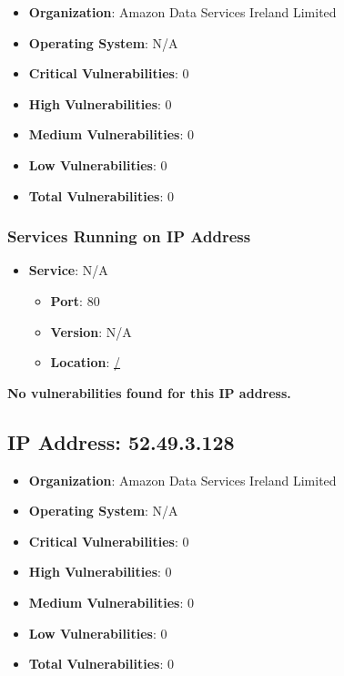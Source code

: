 \documentclass{article}
\begin{document}
\begin{itemize}
    \item \textbf{Organization}: Amazon Data Services Ireland Limited
    \item \textbf{Operating System}:  N/A 
    \item \textbf{Critical Vulnerabilities}: 0
    \item \textbf{High Vulnerabilities}: 0
    \item \textbf{Medium Vulnerabilities}: 0
    \item \textbf{Low Vulnerabilities}: 0
    \item \textbf{Total Vulnerabilities}: 0
\end{itemize}

\subsubsection*{Services Running on IP Address}

\begin{itemize}
    
        \item \textbf{Service}: N/A
        \begin{itemize}
            \item \textbf{Port}: 80
            \item \textbf{Version}:  N/A 
            \item \textbf{Location}: \href{ / }{ / }
        \end{itemize}
    
\end{itemize}


\textbf{No vulnerabilities found for this IP address.}




\clearpage



\subsection*{IP Address: 52.49.3.128}

\begin{itemize}
    \item \textbf{Organization}: Amazon Data Services Ireland Limited
    \item \textbf{Operating System}:  N/A 
    \item \textbf{Critical Vulnerabilities}: 0
    \item \textbf{High Vulnerabilities}: 0
    \item \textbf{Medium Vulnerabilities}: 0
    \item \textbf{Low Vulnerabilities}: 0
    \item \textbf{Total Vulnerabilities}: 0
\end{itemize}
\end{document}
